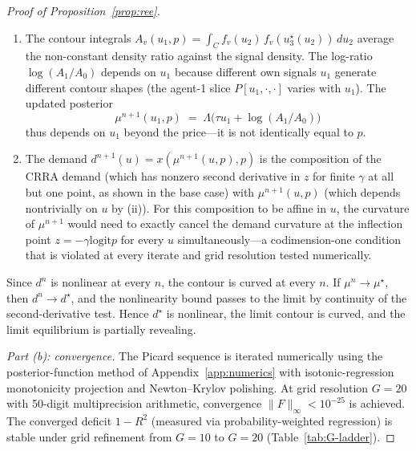 \documentclass[12pt,letterpaper]{article}
\theoremstyle{definition}
\theoremstyle{remark}
\newcommand{\Lam}{\Lambda}            %
\newcommand{\logit}{\mathrm{logit}}
\newcommand{\1}{\mathbf{1}}
\begin{document}
\begin{proof}[Proof of Proposition~\ref{prop:ree}]
\begin{enumerate}[label=(\roman*),topsep=2pt,itemsep=2pt]
\item The contour integrals
$A_{v}(u_{1},p)=\int_{C}f_{v}(u_{2})\,f_{v}(u_{3}^{\star}(u_{2}))\,du_{2}$
average the non-constant density ratio against the signal density. The
log-ratio $\log(A_{1}/A_{0})$ depends on $u_{1}$ because different own
signals $u_{1}$ generate different contour shapes (the agent-1 slice
$P[u_{1},\cdot,\cdot]$ varies with $u_{1}$). The updated posterior
\[
   \mu^{n+1}(u_{1},p) \;=\; \Lam\!\bigl(\tau u_{1}+\log(A_{1}/A_{0})\bigr)
\]
thus depends on $u_{1}$ beyond the price---it is not identically equal
to $p$.

\item The demand $d^{n+1}(u)=x(\mu^{n+1}(u,p),p)$ is the composition of
the CRRA demand (which has nonzero second derivative in $z$ for finite
$\gamma$ at all but one point, as shown in the base case) with
$\mu^{n+1}(u,p)$ (which depends nontrivially on $u$ by (ii)). For this
composition to be affine in $u$, the curvature of $\mu^{n+1}$ would need
to exactly cancel the demand curvature at the inflection point
$z=-\gamma\logit p$ for every $u$ simultaneously---a codimension-one
condition that is violated at every iterate and grid resolution tested
numerically.
\end{enumerate}

Since $d^{n}$ is nonlinear at every $n$, the contour is curved at every
$n$. If $\mu^{n}\to\mu^{\star}$, then $d^{n}\to d^{\star}$, and the
nonlinearity bound passes to the limit by continuity of the
second-derivative test. Hence $d^{\star}$ is nonlinear, the limit
contour is curved, and the limit equilibrium is partially revealing.

\emph{Part (b): convergence.} The Picard sequence is iterated
numerically using the posterior-function method of
Appendix~\ref{app:numerics} with isotonic-regression monotonicity
projection and Newton--Krylov polishing. At grid resolution $G=20$
with 50-digit multiprecision arithmetic, convergence
$\|F\|_{\infty}<10^{-25}$ is achieved. The converged deficit $1-R^{2}$
(measured via probability-weighted regression) is stable under grid
refinement from $G=10$ to $G=20$
(Table~\ref{tab:G-ladder}).
\end{proof}
\end{document}
